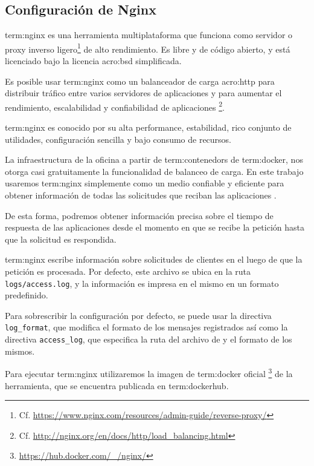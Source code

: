\subsection{Configuración de Nginx}
\label{configuracion_de_nginx}

\gls{term:nginx} es una herramienta multiplataforma que funciona como servidor
 o proxy inverso ligero\footnote{Cf.
\url{https://www.nginx.com/resources/admin-guide/reverse-proxy/}} de alto
rendimiento. Es  libre y de código abierto, y está licenciado bajo la
licencia \gls{acro:bsd} simplificada.

Es posible usar \gls{term:nginx} como un balanceador de carga \gls{acro:http}
para distribuir tráfico entre varios servidores de aplicaciones y para aumentar
el rendimiento, escalabilidad y confiabilidad de aplicaciones 
\footnote{Cf. \url{http://nginx.org/en/docs/http/load_balancing.html}}.

\gls{term:nginx} es conocido por su alta performance, estabilidad, rico
conjunto de utilidades, configuración sencilla y bajo consumo de recursos.

La infraestructura de la oficina a partir de \glspl{term:contenedor} de
\gls{term:docker}, nos otorga casi gratuitamente la funcionalidad de balanceo de
carga. En este trabajo usaremos \gls{term:nginx} simplemente como un medio
confiable y eficiente para obtener información de todas las solicitudes que
reciban las aplicaciones .

De esta forma, podremos obtener información precisa sobre el tiempo de
respuesta de las aplicaciones desde el momento en que se recibe la petición
hasta que la solicitud es respondida.

\gls{term:nginx} escribe información sobre solicitudes de clientes en el \texttt{} luego de que la petición  es procesada. Por defecto, este
archivo se ubica en la ruta \texttt{logs/access.log}, y la información es
impresa en el mismo en un formato predefinido.

Para sobrescribir la configuración por defecto, se puede usar la directiva
\texttt{log\_format}, que modifica el formato de los mensajes registrados así
como la directiva \texttt{access\_log}, que especifica la ruta del archivo de
 y el formato de los mismos.

Para ejecutar \gls{term:nginx} utilizaremos la imagen de \gls{term:docker}
oficial \footnote{\url{https://hub.docker.com/_/nginx/}} de la herramienta, que
se encuentra publicada en \gls{term:dockerhub}.

